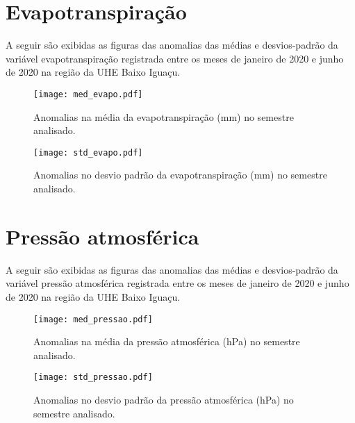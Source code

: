 \documentclass[a4paper,12pt]{article}
\begin{document}
        
        \newpage
        
        \section{Evapotranspiração }
        \hspace{0.5cm} A seguir são exibidas as figuras das anomalias das médias e desvios-padrão da variável evapotranspiração 
        registrada entre os meses de janeiro de 2020 e junho de 2020 na região da UHE Baixo Iguaçu.
        
        \begin{figure}[!htb]
        \centering
        \texttt{[image: med\_evapo.pdf]}
        \caption{Anomalias na média da evapotranspiração (mm) no semestre analisado.}
        \label{fig:figmed_evapo}
        \end{figure}
        
        \begin{figure}[!htb]
        \centering
        \texttt{[image: std\_evapo.pdf]}
        \caption{Anomalias no desvio padrão da evapotranspiração (mm) no semestre analisado.}
        \label{fig:figstd_evapo}
        \end{figure}  
        
        
        \newpage
        
        \section{Pressão atmosférica }
        \hspace{0.5cm} A seguir são exibidas as figuras das anomalias das médias e desvios-padrão da variável pressão atmosférica 
        registrada entre os meses de janeiro de 2020 e junho de 2020 na região da UHE Baixo Iguaçu.
        
        \begin{figure}[!htb]
        \centering
        \texttt{[image: med\_pressao.pdf]}
        \caption{Anomalias na média da pressão atmosférica (hPa) no semestre analisado.}
        \label{fig:figmed_pressao}
        \end{figure}
        
        \begin{figure}[!htb]
        \centering
        \texttt{[image: std\_pressao.pdf]}
        \caption{Anomalias no desvio padrão da pressão atmosférica (hPa) no semestre analisado.}
        \label{fig:figstd_pressao}
        \end{figure}  
        
\end{document}
